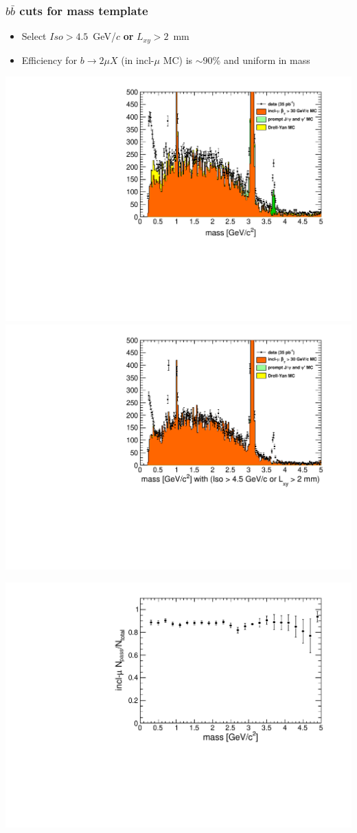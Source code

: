 \documentclass[compress]{beamer}
\begin{document}
\begin{frame}
\frametitle{$b\bar{b}$ cuts for mass template}

\begin{itemize}
\item Select $Iso > 4.5$~GeV/$c$ {\bf or} $L_{xy} > 2$~mm
\item Efficiency for $b \to 2\mu X$ (in incl-$\mu$ MC) is $\sim$90\% and uniform in mass
\end{itemize}

\includegraphics[width=0.5\linewidth]{lowdimuon_mass_nobcuts.pdf}
\includegraphics[width=0.5\linewidth]{lowdimuon_mass_bcuts.pdf}
\begin{center}
\includegraphics[width=0.45\linewidth]{lowdimuon_mass_bcut_efficiency.pdf}
\end{center}
\end{frame}
\end{document}
